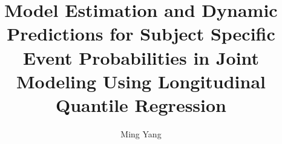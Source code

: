 \documentclass{article}
\begin{document}
\title{ Model Estimation and Dynamic Predictions for Subject Specific Event Probabilities in Joint Modeling Using Longitudinal Quantile Regression}
\author{Ming Yang}
\date{}
\maketitle


\tableofcontents
\listoftables
\listoffigures


% 



% 


\newpage

\end{document}
